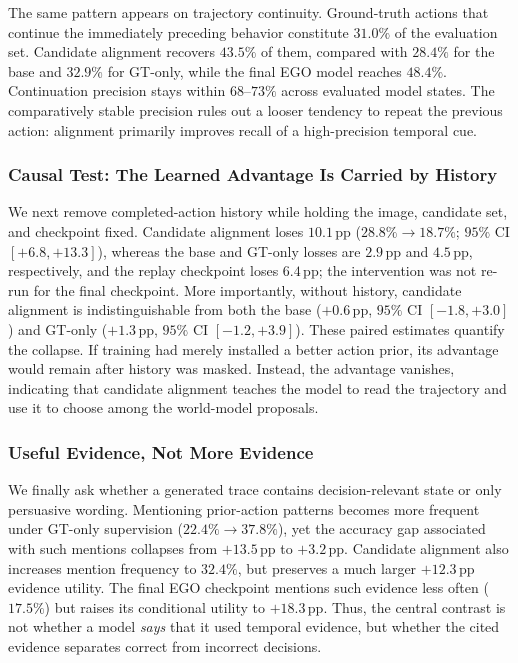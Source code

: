\documentclass[letterpaper]{article}
\newcommand{\obs}[1]{\textcolor{measuredblue}{#1}}
\newcommand{\pp}{\,\mathrm{pp}}
\newcommand{\method}{\textsc{EGO}}
\begin{document}
The same pattern appears on trajectory continuity.  Ground-truth actions that
continue the immediately preceding behavior constitute \obs{$31.0\%$} of the
evaluation set.  Candidate alignment recovers \obs{$43.5\%$} of them, compared
with \obs{$28.4\%$} for the base and \obs{$32.9\%$} for GT-only, while the
final \method{} model reaches \obs{$48.4\%$}.  Continuation precision
stays within \obs{$68$--$73\%$} across evaluated model states.  The comparatively stable
precision rules out a looser tendency to repeat the previous action:
alignment primarily improves recall of a high-precision temporal cue.

\subsubsection{Causal Test: The Learned Advantage Is Carried by History}
\label{sec:er-history}

We next remove completed-action history while holding the image, candidate
set, and checkpoint fixed.  Candidate alignment loses \obs{$10.1\pp$}
(\obs{$28.8\%\!\rightarrow18.7\%$};
\obs{$95\%$ CI $[+6.8,+13.3]$}), whereas the base and GT-only losses are
\obs{$2.9\pp$} and \obs{$4.5\pp$}, respectively, and the replay checkpoint
loses \obs{$6.4\pp$}; the intervention was not re-run for the final
checkpoint.  More importantly, without
history, candidate alignment is indistinguishable from both the base
(\obs{$+0.6\pp$}, \obs{$95\%$ CI $[-1.8,+3.0]$}) and GT-only
(\obs{$+1.3\pp$}, \obs{$95\%$ CI $[-1.2,+3.9]$}).
These paired estimates quantify the collapse.  If training had merely
installed a better action prior, its advantage would remain after history was
masked.  Instead, the advantage vanishes, indicating that candidate alignment
teaches the model to read the trajectory and use it to choose among the
world-model proposals.

\subsubsection{Useful Evidence, Not More Evidence}
\label{sec:er-evidence}

We finally ask whether a generated trace contains decision-relevant state or
only persuasive wording.  Mentioning prior-action patterns becomes more
frequent under GT-only supervision
(\obs{$22.4\%\!\rightarrow37.8\%$}), yet the accuracy gap associated with
such mentions collapses from \obs{$+13.5\pp$} to \obs{$+3.2\pp$}.
Candidate alignment also increases mention frequency to \obs{$32.4\%$}, but
preserves a much larger \obs{$+12.3\pp$} evidence utility.  The final
\method{} checkpoint mentions such evidence less often (\obs{$17.5\%$}) but
raises its conditional utility to \obs{$+18.3\pp$}.  Thus, the central
contrast is not whether a model \emph{says} that it used temporal evidence,
but whether the cited evidence separates correct from incorrect decisions.
\end{document}
